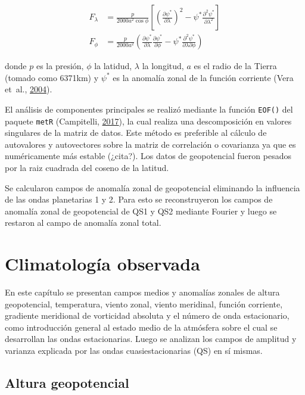 \documentclass[spanish,a4paper,12pt,oneside]{book}
\begin{document}
\[
\begin{aligned}
F_\lambda &= \frac{p}{2000a^2\cos\phi}\left[ \left( \frac{\partial \psi^*}{\partial \lambda} \right)^2 - \psi^*\frac{\partial^2 \psi^*}{\partial \lambda^2}  \right] \\
F_\phi &= \frac{p}{2000a^2} \left( \frac{\partial \psi^*}{\partial \lambda}\frac{\partial \psi^*}{\partial \phi}  - \psi^* \frac{\partial^2 \psi^*}{\partial \lambda \partial \phi} \right) 
\end{aligned}
\]

donde \(p\) es la presión, \(\phi\) la latidud, \(\lambda\) la longitud,
\(a\) es el radio de la Tierra (tomado como 6371km) y \(\psi^*\) es la
anomalía zonal de la función corriente (Vera et~al.,
\protect\hyperlink{ref-Vera2004}{2004}).

El análisis de componentes principales se realizó mediante la función
\texttt{EOF()} del paquete \texttt{metR} (Campitelli,
\protect\hyperlink{ref-R-metR}{2017}), la cual realiza una
descomposición en valores singulares de la matriz de datos. Este método
es preferible al cálculo de autovalores y autovectores sobre la matriz
de correlación o covarianza ya que es numéricamente más estable
(¿cita?). Los datos de geopotencial fueron pesados por la raiz cuadrada
del coseno de la latitud.

Se calcularon campos de anomalía zonal de geopotencial eliminando la
influencia de las ondas planetarias 1 y 2. Para esto se reconstruyeron
los campos de anomalía zonal de geopotencial de QS1 y QS2 mediante
Fourier y luego se restaron al campo de anomalía zonal total.

\chapter{Climatología observada}\label{climatologia-observada}

En este capítulo se presentan campos medios y anomalías zonales de
altura geopotencial, temperatura, viento zonal, viento meridinal,
función corriente, gradiente meridional de vorticidad absoluta y el
número de onda estacionario, como introducción general al estado medio
de la atmósfera sobre el cual se desarrollan las ondas estacionarias.
Luego se analizan los campos de amplitud y varianza explicada por las
ondas cuasiestacionarias (QS) en sí mismas.

\section{Altura geopotencial}\label{altura-geopotencial}
\end{document}
